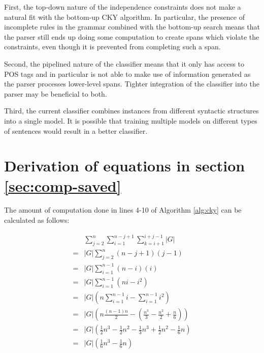 \documentclass[11pt]{article}
\begin{document}
First, the top-down nature of the independence constraints does not
make a natural fit with the bottom-up CKY algorithm. In particular,
the presence of incomplete rules in the grammar combined with the
bottom-up search means that the parser still ends up doing some
computation to create spans which violate the constraints, even though
it is prevented from completing such a span.

Second, the pipelined nature of the classifier means that it only has
access to POS tags and in particular is not able to make use of
information generated as the parser processes lower-level spans.
Tighter integration of the classifier into the parser may be
beneficial to both.

Third, the current classifier combines instances from different
syntactic structures into a single model. It is possible that training
multiple models on different types of sentences would result in a
better classifier.

\appendix
\label{sec-8}

\section{Derivation of equations in section \ref{sec:comp-saved}}
\label{sec:derivation-equations}

The amount of computation done in lines 4-10 of Algorithm \ref{alg:cky} can be calculated as follows:

\begin{align*}
& \sum_{j=2}^{n}\sum_{i=1}^{n-j+1}\sum_{k=i+1}^{i+j-1}|G|\\
=& |G|\sum_{j=2}^{n}(n-j+1)(j-1)\\
=& |G|\sum_{i=1}^{n-1}(n-i)(i)\\
=& |G|\sum_{i=1}^{n-1}(ni - i^2)\\
=& |G|(n\sum_{i=1}^{n-1}i - \sum_{i=1}^{n-1}i^2)\\
=& |G|(n\frac{(n-1)n}{2} - (\frac{n^3}{3} - \frac{n^2}{2} + \frac{n}{6}))\\
=& |G|(\frac{1}{2}n^3 - \frac{1}{2}n^2 - \frac{1}{3}n^3 + \frac{1}{2}n^2 - \frac{1}{6}n)\\
=& |G|(\frac{1}{6}n^3 - \frac{1}{6}n)
\end{align*}
\end{document}
